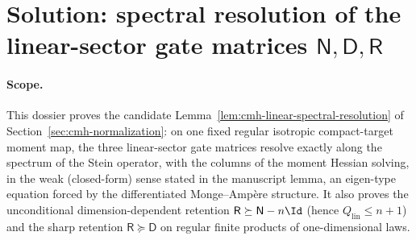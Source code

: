 \documentclass[../main.tex]{subfiles}
\begin{document}
%
%
%
%
%

\section*{Solution: spectral resolution of the linear-sector gate matrices
$\mathsf N,\mathsf D,\mathsf R$}
\label{sec:sol-clsr}

\paragraph{Scope.}
This dossier proves the candidate Lemma~\ref{lem:cmh-linear-spectral-resolution} of
Section~\ref{sec:cmh-normalization}: on one fixed regular isotropic compact-target moment map,
the three linear-sector gate matrices resolve exactly along the spectrum of the Stein operator,
with the columns of the moment Hessian solving, in the weak (closed-form) sense stated in the
manuscript lemma, an eigen-type equation forced by the differentiated Monge--Amp\`ere
structure.  It also proves the unconditional
dimension-dependent retention $\mathsf R\succeq\mathsf N-n\Id$ (hence
$Q_{\mathrm{lin}}\le n+1$) and the sharp retention $\mathsf R\succeq\mathsf D$ on regular
finite products of one-dimensional laws.
\end{document}
